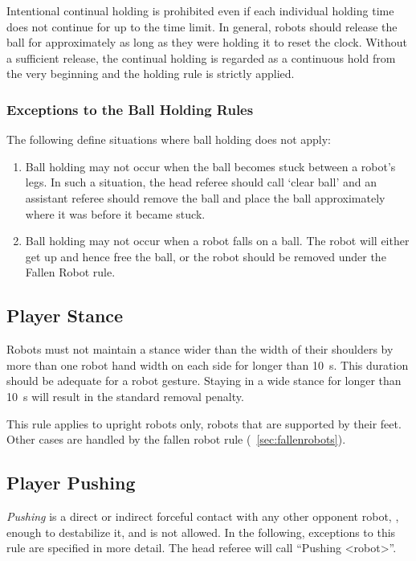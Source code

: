 Intentional continual holding is prohibited even if each individual holding time does not continue for up to the time limit.
In general, robots should release the ball for approximately as long as they were holding it to reset the clock.
Without a sufficient release, the continual holding is regarded as a continuous hold from the very beginning and the holding rule is strictly applied.

\subsubsection{Exceptions to the Ball Holding Rules}
\label{sec:situations_no_ball_holding}

The following define situations where ball holding does not apply:
\begin{enumerate}
  \item Ball holding may not occur when the ball becomes stuck between a robot's legs.
    In such a situation, the head referee should call `clear ball' and an assistant referee should remove the ball and place the ball approximately where it was before it became stuck.
  \item Ball holding may not occur when a robot falls on a ball.
    The robot will either get up and hence free the ball, or the robot should be removed under the Fallen Robot rule.
\end{enumerate}

\subsection{Player Stance}
\label{sec:player_stance}

Robots must not maintain a stance wider than the width of their shoulders by more than one robot hand width on each side for longer than \qty{10}{\second}. This duration should be adequate for a robot gesture. Staying in a wide stance for longer than \qty{10}{\second} will result in the standard removal penalty.

This rule applies to upright robots only, \ie robots that are supported by their feet.
Other cases are handled by the fallen robot rule (\cf~\cref{sec:fallenrobots}).

\subsection{Player Pushing}
\label{sec:player_pushing}

\emph{Pushing} is a direct or indirect forceful contact with any other opponent robot, \ie, enough to destabilize it, and is not allowed.
In the following, exceptions to this rule are specified in more detail.
The head referee will call ``Pushing \textless robot\textgreater''.

